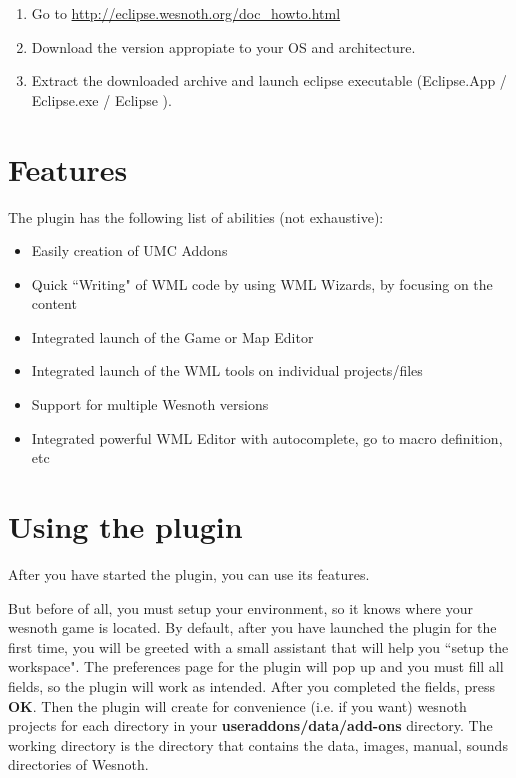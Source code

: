\documentclass[10pt]{article}
\begin{document}
\begin{enumerate}
  \item Go to \href{http://eclipse.wesnoth.org/doc\_howto.html}{http://eclipse.wesnoth.org/doc\_howto.html}
  \item Download the version appropiate to your OS and architecture.
  \item Extract the downloaded archive and launch eclipse executable (Eclipse.App / Eclipse.exe / Eclipse ).
\end{enumerate}

\section{Features}

The plugin has the following list of abilities (not exhaustive):
\begin{itemize}
  \item Easily creation of UMC Addons
  \item Quick ``Writing" of WML code by using WML Wizards, by focusing on the content
  \item Integrated launch of the Game or Map Editor
  \item Integrated launch of the WML tools on individual projects/files
  \item Support for multiple Wesnoth versions
  \item Integrated powerful WML Editor with autocomplete, go to macro definition, etc
\end{itemize}

\section{Using the plugin}
After you have started the plugin, you can use its features.

But before of all, you must setup your environment, so it knows where your wesnoth game is located. By default, after you have launched the plugin for the first time, you will be greeted with a small assistant that will help you ``setup the workspace". The preferences page for the plugin will pop up and you must fill all fields, so the plugin will work as intended. After you completed the fields, press \textbf{OK}. Then the plugin will create for convenience (i.e. if you want) wesnoth projects for each directory in your \textbf{useraddons/data/add-ons} directory. The working directory is the directory that contains the data, images, manual, sounds directories of Wesnoth.
\end{document}
